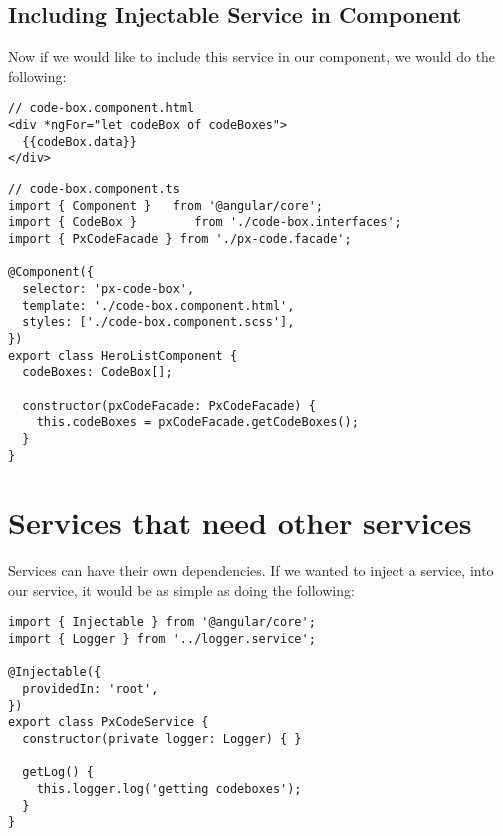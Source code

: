
\subsection{ Including Injectable Service in Component }
Now if we would like to include this service in our component, we would do the
following:
\begin{lstlisting}
// code-box.component.html
<div *ngFor="let codeBox of codeBoxes">
  {{codeBox.data}}
</div>
\end{lstlisting}

\begin{lstlisting}
// code-box.component.ts
import { Component }   from '@angular/core';
import { CodeBox }        from './code-box.interfaces';
import { PxCodeFacade } from './px-code.facade';

@Component({
  selector: 'px-code-box',
  template: './code-box.component.html',
  styles: ['./code-box.component.scss'],
})
export class HeroListComponent {
  codeBoxes: CodeBox[];

  constructor(pxCodeFacade: PxCodeFacade) {
    this.codeBoxes = pxCodeFacade.getCodeBoxes();
  }
}
\end{lstlisting}


\section{Services that need other services}
Services can have their own dependencies. If we wanted to inject a service, into
our service, it would be as simple as doing the following:
\begin{lstlisting}
import { Injectable } from '@angular/core';
import { Logger } from '../logger.service';

@Injectable({
  providedIn: 'root',
})
export class PxCodeService {
  constructor(private logger: Logger) { }

  getLog() {
    this.logger.log('getting codeboxes');
  }
}
\end{lstlisting}

